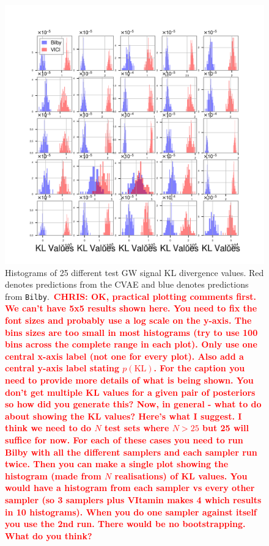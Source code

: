 \documentclass[%
showpacs,
 amsmath,amssymb,
 aps,
 twocolumn,
 prl,
 reprint,
floatfix,
]{revtex4-1}
\newcommand{\chris}[1]{\textbf{\textcolor{red}{CHRIS: #1}}}
\begin{document}
%
%
\begin{figure}
    \includegraphics[width=\columnwidth]{images/hist-kl_0.png}
    \caption{\label{fig:kl_results} Histograms of 25 different test GW signal
KL divergence values.  Red denotes predictions from the CVAE and blue denotes
predictions from \texttt{Bilby}.~\chris{OK, practical plotting comments first.
We can't have 5x5 results shown here. You need to fix the font sizes and
probably use a log scale on the y-axis. The bins sizes are too small in most
histograms (try to use 100 bins across the complete range in each plot). Only
use one central x-axis label (not one for every plot). Also add a central
y-axis label stating $p(\text{KL})$. For the caption you need to provide more
details of what is being shown. You don't get multiple KL values for a given
pair of posteriors so how did you generate this? Now, in general - what to do
about showing the KL values? Here's what I suggest. I think we need to do $N$
test sets where $N>25$ but 25 will suffice for now. For each of these cases you
need to run Bilby with all the different samplers and each sampler run twice.
Then you can make a single plot showing the histogram (made from $N$
realisations) of KL values. You would have a histogram from each sampler vs
every other sampler (so 3 samplers plus VItamin makes 4 which results in 10
histograms). When  you do one sampler against itself you use the 2nd run. There
would be no bootstrapping. What do you think?}}
\end{figure}
\end{document}
